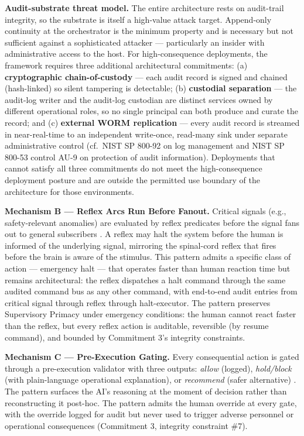 \textbf{Audit-substrate threat model.} The entire architecture rests on
audit-trail integrity, so the substrate is itself a high-value attack
target. Append-only continuity at the orchestrator is the minimum
property and is necessary but not sufficient against a sophisticated
attacker --- particularly an insider with administrative access to the
host. For high-consequence deployments, the framework requires three
additional architectural commitments: (a) \textbf{cryptographic
chain-of-custody} --- each audit record is signed and chained
(hash-linked) so silent tampering is detectable; (b) \textbf{custodial
separation} --- the audit-log writer and the audit-log custodian are
distinct services owned by different operational roles, so no single
principal can both produce and curate the record; and (c)
\textbf{external WORM replication} --- every audit record is streamed in
near-real-time to an independent write-once, read-many sink under
separate administrative control (cf.~NIST SP 800-92 \cite{ref10} on log
management and NIST SP 800-53 control AU-9 on protection of audit
information). Deployments that cannot satisfy all three commitments do
not meet the high-consequence deployment posture and are outside the
permitted use boundary of the architecture for those environments.

\textbf{Mechanism B --- Reflex Arcs Run Before Fanout.} Critical signals
(e.g., safety-relevant anomalies) are evaluated by reflex predicates
before the signal fans out to general subscribers \cite{ref3}. A reflex may
halt the system before the human is informed of the underlying signal,
mirroring the spinal-cord reflex that fires before the brain is aware of
the stimulus. This pattern admits a specific class of action ---
emergency halt --- that operates faster than human reaction time but
remains architectural: the reflex dispatches a halt command through the
same audited command bus as any other command, with end-to-end audit
entries from critical signal through reflex through halt-executor. The
pattern preserves Supervisory Primacy under emergency conditions: the
human cannot react faster than the reflex, but every reflex action is
auditable, reversible (by resume command), and bounded by Commitment 3's
integrity constraints.

\textbf{Mechanism C --- Pre-Execution Gating.} Every consequential
action is gated through a pre-execution validator with three outputs:
\emph{allow} (logged), \emph{hold/block} (with plain-language
operational explanation), or \emph{recommend} (safer alternative)
\cite{ref4}. The pattern surfaces the AI's reasoning at the moment of
decision rather than reconstructing it post-hoc. The pattern admits the
human override at every gate, with the override logged for audit but
never used to trigger adverse personnel or operational consequences
(Commitment 3, integrity constraint \#7).

